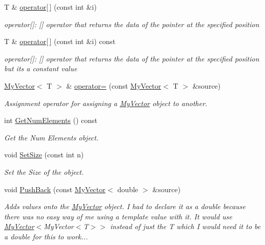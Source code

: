 \begin{DoxyCompactItemize}
T \& \mbox{\hyperlink{class_my_vector_a52eca35ed558d978bf5a8541f9d0115c}{operator\mbox{[}$\,$\mbox{]}}} (const int \&i)
\begin{DoxyCompactList}\small\item\em operator\mbox{[}\mbox{]}\+: \mbox{[}\mbox{]} operator that returns the data of the pointer at the specified position \end{DoxyCompactList}\item 
T \& \mbox{\hyperlink{class_my_vector_a01d48c27ba17ad15aa29b2f039c303cd}{operator\mbox{[}$\,$\mbox{]}}} (const int \&i) const
\begin{DoxyCompactList}\small\item\em operator\mbox{[}\mbox{]}\+: \mbox{[}\mbox{]} operator that returns the data of the pointer at the specified position but it\textquotesingle{}s a constant value \end{DoxyCompactList}\item 
\mbox{\hyperlink{class_my_vector}{My\+Vector}}$<$ T $>$ \& \mbox{\hyperlink{class_my_vector_a459ecae4c3fc3836415467db79bd0af2}{operator=}} (const \mbox{\hyperlink{class_my_vector}{My\+Vector}}$<$ T $>$ \&source)
\begin{DoxyCompactList}\small\item\em Assignment operator for assigning a \mbox{\hyperlink{class_my_vector}{My\+Vector}} object to another. \end{DoxyCompactList}\item 
int \mbox{\hyperlink{class_my_vector_a5806423f48877c084cc436ecdffa756c}{Get\+Num\+Elements}} () const
\begin{DoxyCompactList}\small\item\em Get the Num Elements object. \end{DoxyCompactList}\item 
void \mbox{\hyperlink{class_my_vector_a54da580455b3348ddc47a6359e9db444}{Set\+Size}} (const int n)
\begin{DoxyCompactList}\small\item\em Set the Size of the object. \end{DoxyCompactList}\item 
void \mbox{\hyperlink{class_my_vector_a1070a35184f1a8223a7df7f4fdd78492}{Push\+Back}} (const \mbox{\hyperlink{class_my_vector}{My\+Vector}}$<$ double $>$ \&source)
\begin{DoxyCompactList}\small\item\em Adds values onto the \mbox{\hyperlink{class_my_vector}{My\+Vector}} object. I had to declare it as a double because there was no easy way of me using a template value with it. It would use \mbox{\hyperlink{class_my_vector}{My\+Vector}}$<$My\+Vector$<$\+T$>$$>$ instead of just the T which I would need it to be a double for this to work... \end{DoxyCompactList}\end{DoxyCompactItemize}


